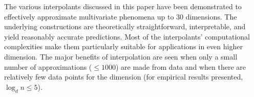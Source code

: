 \documentclass[smallextended,final]{svjour3}  %
\begin{document}
The various interpolants discussed in this paper have been
demonstrated to effectively approximate multivariate phenomena up to
$30$ dimensions. The underlying constructions are theoretically
straightforward, interpretable, and yield reasonably accurate
predictions. Most of the interpolants' computational complexities make
them particularly suitable for applications in even higher
dimension. The major benefits of interpolation are seen when only a
small number of approximations ($\leq 1000$) are made from data and
when there are relatively few data points for the dimension (for
empirical results presented, $\log_d n \leq 5$).





\newpage
\end{document}
